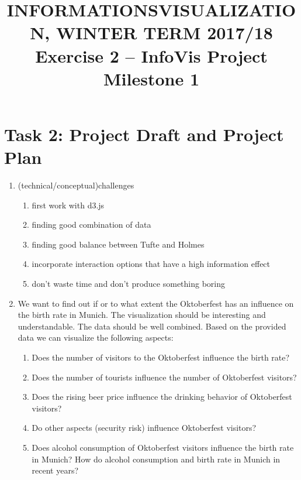 \documentclass[11pt, twoside, BCOR=8mm, DIV=12]{scrartcl}
\title{{\Large INFORMATIONSVISUALIZATION, WINTER TERM 2017/18} \\ Exercise 2 – InfoVis Project Milestone 1}
\begin{document}
\maketitle
\section*{Task 2: Project Draft and Project Plan}
\begin{enumerate}[label=\alph*)]
\item (technical/conceptual)challenges
\begin{enumerate}[label=\arabic*)]
\item first work with d3.js
\item finding good combination of data
\item finding good balance between Tufte and Holmes
\item incorporate interaction options that have a high information effect
\item don't waste time and don't produce something boring
\end{enumerate}
\item We want to find out if or to what extent the Oktoberfest has an influence on the birth rate in Munich.
The visualization should be interesting and understandable.
The data should be well combined.
Based on the provided data we can visualize the following aspects:
\begin{enumerate}[label=\arabic*)]
\item Does the number of visitors to the Oktoberfest influence the birth rate?
\item Does the number of tourists influence the number of Oktoberfest visitors?
\item Does the rising beer price influence the drinking behavior of Oktoberfest visitors?
\item Do other aspects (security risk) influence Oktoberfest visitors?
\item Does alcohol consumption of  Oktoberfest visitors influence the birth rate in Munich? How do alcohol consumption and birth rate in Munich in recent years?

\end{enumerate}
\end{enumerate}
\end{document}
